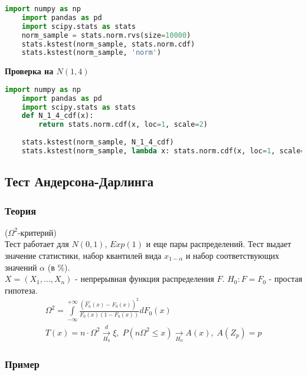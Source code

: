 \begin{lstlisting}[language=Python]
	import numpy as np
	import pandas as pd
	import scipy.stats as stats
	norm_sample = stats.norm.rvs(size=10000)
	stats.kstest(norm_sample, stats.norm.cdf)
	stats.kstest(norm_sample, 'norm')
\end{lstlisting}

\textbf{Проверка на $N(1,4)$}

\begin{lstlisting}[language=Python]
	import numpy as np
	import pandas as pd
	import scipy.stats as stats
	def N_1_4_cdf(x):
    	return stats.norm.cdf(x, loc=1, scale=2)
	
	stats.kstest(norm_sample, N_1_4_cdf)
	stats.kstest(norm_sample, lambda x: stats.norm.cdf(x, loc=1, scale=2))
\end{lstlisting}

\subsection{Тест Андерсона-Дарлинга}\label{cha:compl/sec:nenorm/subsec:andersondarling}

\subsubsection*{Теория}\label{cha:compl/sec:nenorm/subsec:andersondarling/subsubsection:theory}

($\Omega^2$-критерий)\\

Тест работает для $N(0,1)$, $Exp(1)$ и еще пары распределений. Тест выдает значение статистики, набор квантилей вида $x_{1-\alpha}$ и набор соответствующих значений $\alpha$ (в $\%$).\\

$X = (X_1, \dots, X_n)$ - непрерывная функция распределения $F$. $H_0: F = F_0$ - простая гипотеза.
$$\begin{gathered}
	\Omega^2 = \underset{-\infty}{\overset{+\infty}{\int}}\frac{\left( \hat{F_n}(x) - F_0 (x) \right)^2}{F_0 (x) (1 - F_0 (x))} d F_0 (x) \\
	T (x) = n \cdot \Omega^2 \xrightarrow[H_0]{d} \xi, \; P(n \Omega^2 \le x) \xrightarrow[H_0]{}A(x), \; A(Z_p) = p
\end{gathered}$$

\subsubsection*{Пример}\label{cha:compl/sec:nenorm/subsec:andersondarling/subsubsection:prob}

